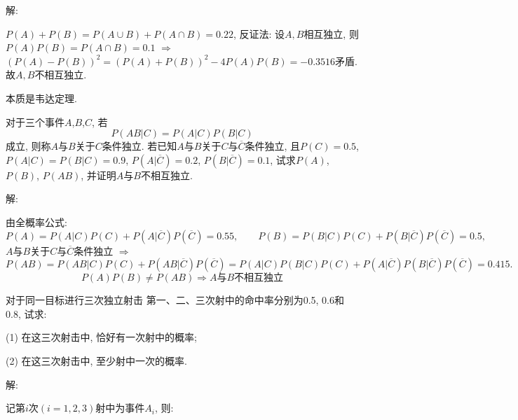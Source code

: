 \documentclass[standard]{ExBook}
\renewenvironment{shaded}{%
  \def\FrameCommand{\fboxsep=\FrameSep \colorbox{shadecolor}}%
  \MakeFramed{\advance\hsize-\width \FrameRestore}%
}{%
  \endMakeFramed
}
\begin{document}
\begin{qitems}
\vspace{\dimexpr2.5cm-5em\relax}

解:

$P(A)+P(B)=P(A\cup B)+P(A\cap B)=0.22$, 反证法: 设$A,B$相互独立, 则$P(A)P(B)=P(A\cap B)=0.1$ $\Longrightarrow$ $\left(P(A)-P(B)\right)^2=\left(P(A)+P(B)\right)^2-4P(A)P(B)=-0.3516$矛盾. 故$A,B$不相互独立.

\textcolor{themeColor}{\selectfont {} 本质是韦达定理.}

\vspace{2.5cm-5em}

    \begin{bbox}
    \begin{shaded}
        \qitem
对于三个事件$A$,$B$,$C$, 若
$$P(AB|C)=P(A|C)P(B|C)$$
成立, 则称$A$与$B$关于$C$条件独立. 若已知$A$与$B$关于$C$与$\overline{C}$条件独立, 且$P(C)=0.5$, $P(A|C)=P(B|C)=0.9$, $P(A|\overline{C})=0.2$, $P(B|\overline{C})=0.1$, 试求$P(A)$, $P(B)$, $P(AB)$, 并证明$A$与$B$不相互独立.
    \end{shaded}
    \end{bbox}

\vspace{\dimexpr2.5cm-5em\relax}

解:

由全概率公式:
$$P(A)=P(A|C)P(C)+P(A|\overline{C})P(\overline{C})=0.55,\qquad P(B)=P(B|C)P(C)+P(B|\overline{C})P(\overline{C})=0.5,$$
$A$与$B$关于$C$与$\overline{C}$条件独立 $\Longrightarrow$
$$P(AB)=P(AB|C)P(C)+P(AB|\overline{C})P(\overline{C})=P(A|C)P(B|C)P(C)+P(A|\overline{C})P(B|\overline{C})P(\overline{C})=0.415.$$
$$P(A)P(B) \neq P(AB) \Longrightarrow A\text{与}B\text{不相互独立}$$

\vspace{2.5cm-5em}

    \begin{bbox}
    \begin{shaded}
        \qitem
对于同一目标进行三次独立射击 第一、二、三次射中的命中率分别为0.5, 0.6和0.8, 试求:

(1) 在这三次射击中, 恰好有一次射中的概率;

(2) 在这三次射击中, 至少射中一次的概率.
    \end{shaded}
    \end{bbox}

\vspace{\dimexpr2.5cm-5em\relax}

解:

记第$i$次$(i=1,2,3)$射中为事件$A_{i}$, 则:


\end{qitems}
\end{document}
